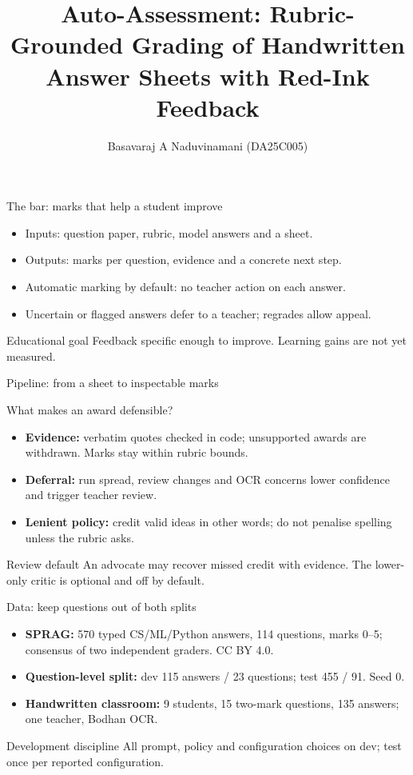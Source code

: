 \documentclass[14pt,aspectratio=169]{beamer}
\title{Auto-Assessment: Rubric-Grounded Grading of Handwritten Answer Sheets with Red-Ink Feedback}
\author{Basavaraj A Naduvinamani (DA25C005)}
\institute{DA7016, IIT Madras}
\date{}
\begin{document}
\begin{frame}
\titlepage
\end{frame}

\begin{frame}{The bar: marks that help a student improve}
\begin{itemize}
  \item Inputs: question paper, rubric, model answers and a sheet.
  \item Outputs: marks per question, evidence and a concrete next step.
  \item Automatic marking by default: no teacher action on each answer.
  \item Uncertain or flagged answers defer to a teacher; regrades allow appeal.
\end{itemize}
\begin{block}{Educational goal}
Feedback specific enough to improve. Learning gains are not yet measured.
\end{block}
\end{frame}

\begin{frame}{Pipeline: from a sheet to inspectable marks}
\centering

\end{frame}

\begin{frame}{What makes an award defensible?}
\begin{itemize}
  \item \textbf{Evidence:} verbatim quotes checked in code; unsupported awards are withdrawn. Marks stay within rubric bounds.
  \item \textbf{Deferral:} run spread, review changes and OCR concerns lower confidence and trigger teacher review.
  \item \textbf{Lenient policy:} credit valid ideas in other words; do not penalise spelling unless the rubric asks.
\end{itemize}
\begin{block}{Review default}
An advocate may recover missed credit with evidence. The lower-only critic is optional and off by default.
\end{block}
\end{frame}

\begin{frame}{Data: keep questions out of both splits}
\begin{itemize}
  \item \textbf{SPRAG:} 570 typed CS/ML/Python answers, 114 questions, marks 0--5; consensus of two independent graders. CC BY 4.0.
  \item \textbf{Question-level split:} dev 115 answers / 23 questions; test 455 / 91. Seed 0.
  \item \textbf{Handwritten classroom:} 9 students, 15 two-mark questions, 135 answers; one teacher, Bodhan OCR.
\end{itemize}
\begin{block}{Development discipline}
All prompt, policy and configuration choices on dev; test once per reported configuration.
\end{block}
\end{frame}
\end{document}
